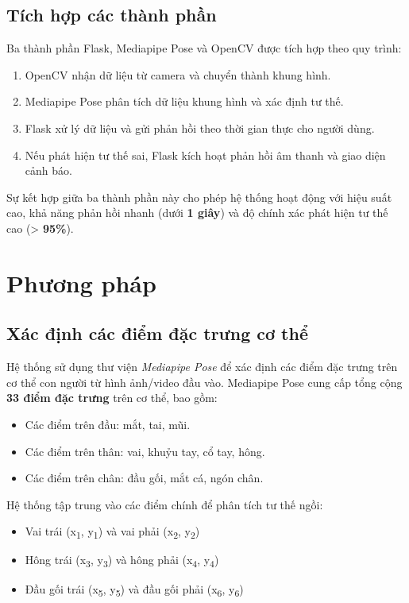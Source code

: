 \documentclass[conference]{IEEEtran}
\begin{document}
\subsection{Tích hợp các thành phần}
Ba thành phần Flask, Mediapipe Pose và OpenCV được tích hợp theo quy trình:
\begin{enumerate}
    \item OpenCV nhận dữ liệu từ camera và chuyển thành khung hình.
    \item Mediapipe Pose phân tích dữ liệu khung hình và xác định tư thế.
    \item Flask xử lý dữ liệu và gửi phản hồi theo thời gian thực cho người dùng.
    \item Nếu phát hiện tư thế sai, Flask kích hoạt phản hồi âm thanh và giao diện cảnh báo.
\end{enumerate}

Sự kết hợp giữa ba thành phần này cho phép hệ thống hoạt động với hiệu suất cao, khả năng phản hồi nhanh (dưới \textbf{1 giây}) và độ chính xác phát hiện tư thế cao (> \textbf{95\%}).


\section{Phương pháp}
\subsection{Xác định các điểm đặc trưng cơ thể}
Hệ thống sử dụng thư viện \textit{Mediapipe Pose} để xác định các điểm đặc trưng trên cơ thể con người từ hình ảnh/video đầu vào. Mediapipe Pose cung cấp tổng cộng \textbf{33 điểm đặc trưng} trên cơ thể, bao gồm:
\begin{itemize}
    \item Các điểm trên đầu: mắt, tai, mũi.
    \item Các điểm trên thân: vai, khuỷu tay, cổ tay, hông.
    \item Các điểm trên chân: đầu gối, mắt cá, ngón chân.
\end{itemize}

Hệ thống tập trung vào các điểm chính để phân tích tư thế ngồi:
\begin{itemize}
    \item Vai trái (x\textsubscript{1}, y\textsubscript{1}) và vai phải (x\textsubscript{2}, y\textsubscript{2})
    \item Hông trái (x\textsubscript{3}, y\textsubscript{3}) và hông phải (x\textsubscript{4}, y\textsubscript{4})
    \item Đầu gối trái (x\textsubscript{5}, y\textsubscript{5}) và đầu gối phải (x\textsubscript{6}, y\textsubscript{6})
\end{itemize}
\end{document}
